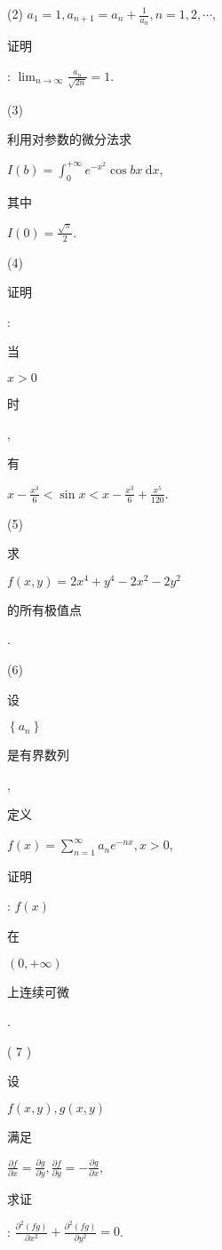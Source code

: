 \documentclass[10pt]{article}
\begin{document}
(2) $a_{1}=1, a_{n+1}=a_{n}+\frac{1}{a_{n}}, n=1,2, \cdots$, \begin{CJK}{UTF8}{mj}证明\end{CJK}: $\lim _{n \rightarrow \infty} \frac{a_{n}}{\sqrt{2 n}}=1$.

(3) \begin{CJK}{UTF8}{mj}利用对参数的微分法求\end{CJK} $I(b)=\int_{0}^{+\infty} e^{-x^{2}} \cos b x \mathrm{~d} x$, \begin{CJK}{UTF8}{mj}其中\end{CJK} $I(0)=\frac{\sqrt{\pi}}{2}$.

(4) \begin{CJK}{UTF8}{mj}证明\end{CJK}: \begin{CJK}{UTF8}{mj}当\end{CJK} $x>0$ \begin{CJK}{UTF8}{mj}时\end{CJK}, \begin{CJK}{UTF8}{mj}有\end{CJK} $x-\frac{x^{3}}{6}<\sin x<x-\frac{x^{3}}{6}+\frac{x^{5}}{120}$.

(5) \begin{CJK}{UTF8}{mj}求\end{CJK} $f(x, y)=2 x^{4}+y^{4}-2 x^{2}-2 y^{2}$ \begin{CJK}{UTF8}{mj}的所有极值点\end{CJK}.

(6) \begin{CJK}{UTF8}{mj}设\end{CJK} $\left\{a_{n}\right\}$ \begin{CJK}{UTF8}{mj}是有界数列\end{CJK}, \begin{CJK}{UTF8}{mj}定义\end{CJK} $f(x)=\sum_{n=1}^{\infty} a_{n} e^{-n x}, x>0$, \begin{CJK}{UTF8}{mj}证明\end{CJK}: $f(x)$ \begin{CJK}{UTF8}{mj}在\end{CJK} $(0,+\infty)$ \begin{CJK}{UTF8}{mj}上连续可微\end{CJK}.

( 7 ) \begin{CJK}{UTF8}{mj}设\end{CJK} $f(x, y), g(x, y)$ \begin{CJK}{UTF8}{mj}满足\end{CJK} $\frac{\partial f}{\partial x}=\frac{\partial g}{\partial y}, \frac{\partial f}{\partial y}=-\frac{\partial g}{\partial x}$, \begin{CJK}{UTF8}{mj}求证\end{CJK}: $\frac{\partial^{2}(f g)}{\partial x^{2}}+\frac{\partial^{2}(f g)}{\partial y^{2}}=0$.
\end{document}
